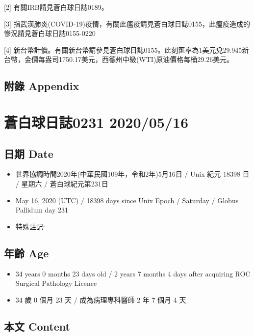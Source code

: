 \documentclass[a5paper, 11pt
]{book}
\providecommand{\tightlist}{%
  \setlength{\itemsep}{0pt}\setlength{\parskip}{0pt}}
\begin{document}
{[}2{]} 有關IRB請見蒼白球日誌0189。

{[}3{]}
指武漢肺炎(COVID-19)疫情，有關此瘟疫請見蒼白球日誌0155，此瘟疫造成的慘況請見蒼白球日誌0155-0220

{[}4{]}
新台幣計價。有關新台幣請參見蒼白球日誌0155。此刻匯率為1美元兌29.945新台幣，金價每盎司1750.17美元，西德州中級(WTI)原油價格每桶29.26美元。

\hypertarget{ux9644ux9304-appendix-75}{%
\subsection{附錄 Appendix}\label{ux9644ux9304-appendix-75}}

\hypertarget{ux84bcux767dux7403ux65e5ux8a8c0231-20200516}{%
\section{蒼白球日誌0231
2020/05/16}\label{ux84bcux767dux7403ux65e5ux8a8c0231-20200516}}

\hypertarget{ux65e5ux671f-date-76}{%
\subsection{日期 Date}\label{ux65e5ux671f-date-76}}

\begin{itemize}
\tightlist
\item
  世界協調時間2020年(中華民國109年，令和2年)5月16日 / Unix 紀元 18398 日
  / 星期六 / 蒼白球紀元第231日
\item
  May 16, 2020 (UTC) / 18398 days since Unix Epoch / Saturday / Globus
  Pallidum day 231
\item
  特殊註記:
\end{itemize}

\hypertarget{ux5e74ux9f61-age-76}{%
\subsection{年齡 Age}\label{ux5e74ux9f61-age-76}}

\begin{itemize}
\tightlist
\item
  34 years 0 months 23 days old / 2 years 7 months 4 days after
  acquiring ROC Surgical Pathology Licence
\item
  34 歲 0 個月 23 天 / 成為病理專科醫師 2 年 7 個月 4 天
\end{itemize}

\hypertarget{ux672cux6587-content-76}{%
\subsection{本文 Content}\label{ux672cux6587-content-76}}
\end{document}

